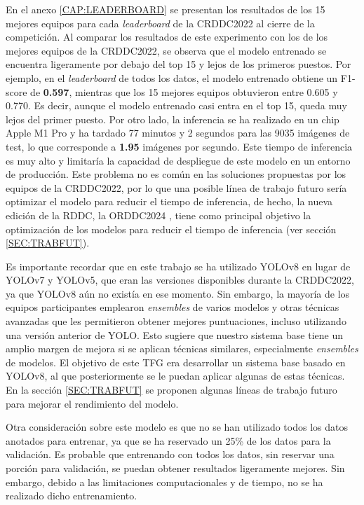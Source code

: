 En el anexo \ref{CAP:LEADERBOARD} se presentan los resultados de los 15 mejores equipos para cada \textit{leaderboard} de la CRDDC2022 al cierre de la competición. Al comparar los resultados de este experimento con los de los mejores equipos de la CRDDC2022, se observa que el modelo entrenado se encuentra ligeramente por debajo del top 15 y lejos de los primeros puestos. Por ejemplo, en el \textit{leaderboard} de todos los datos, el modelo entrenado obtiene un F1-score de \textbf{0.597}, mientras que los 15 mejores equipos obtuvieron entre 0.605 y 0.770. Es decir, aunque el modelo entrenado casi entra en el top 15, queda muy lejos del primer puesto. Por otro lado, la inferencia se ha realizado en un chip Apple M1 Pro y ha tardado 77 minutos y 2 segundos para las 9035 imágenes de test, lo que corresponde a \textbf{1.95} imágenes por segundo. Este tiempo de inferencia es muy alto y limitaría la capacidad de despliegue de este modelo en un entorno de producción. Este problema no es común en las soluciones propuestas por los equipos de la CRDDC2022, por lo que una posible línea de trabajo futuro sería optimizar el modelo para reducir el tiempo de inferencia, de hecho, la nueva edición de la RDDC, la ORDDC2024 \cite{ORDDC2024}, tiene como principal objetivo la optimización de los modelos para reducir el tiempo de inferencia (ver sección \ref{SEC:TRABFUT}).

Es importante recordar que en este trabajo se ha utilizado YOLOv8 en lugar de YOLOv7 y YOLOv5, que eran las versiones disponibles durante la CRDDC2022, ya que YOLOv8 aún no existía en ese momento. Sin embargo, la mayoría de los equipos participantes emplearon \textit{ensembles} de varios modelos y otras técnicas avanzadas que les permitieron obtener mejores puntuaciones, incluso utilizando una versión anterior de YOLO. Esto sugiere que nuestro sistema base tiene un amplio margen de mejora si se aplican técnicas similares, especialmente \textit{ensembles} de modelos. El objetivo de este TFG era desarrollar un sistema base basado en YOLOv8, al que posteriormente se le puedan aplicar algunas de estas técnicas. En la sección \ref{SEC:TRABFUT} se proponen algunas líneas de trabajo futuro para mejorar el rendimiento del modelo.

Otra consideración sobre este modelo es que no se han utilizado todos los datos anotados para entrenar, ya que se ha reservado un 25\% de los datos para la validación. Es probable que entrenando con todos los datos, sin reservar una porción para validación, se puedan obtener resultados ligeramente mejores. Sin embargo, debido a las limitaciones computacionales y de tiempo, no se ha realizado dicho entrenamiento.

